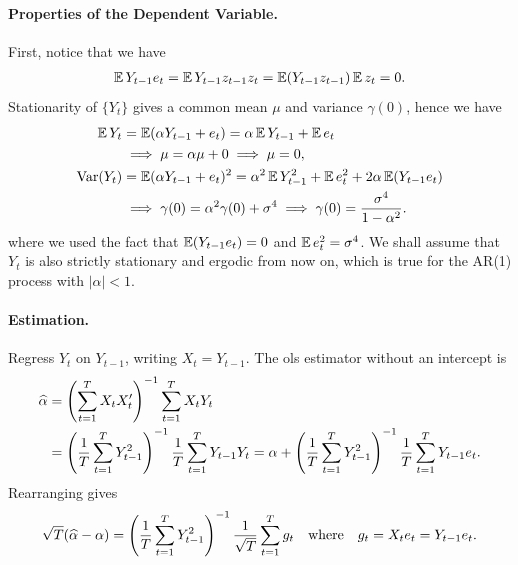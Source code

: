 \documentclass[a4paper,12pt]{article}
\begin{document}
\paragraph{Properties of the Dependent Variable.}
First, notice that we have
\begin{align}
	\operatorname{\mathbb{E}} Y_{t-1} e_t = \operatorname{\mathbb{E}} Y_{t-1} z_{t-1} z_t = \operatorname{\mathbb{E}} (Y_{t-1} z_{t-1}) \operatorname{\mathbb{E}} z_t = 0.
\end{align}
Stationarity of $\{Y_t\}$ gives a common mean $\mu$ and variance $\gamma(0)$, hence we have
\begin{align}
	\operatorname{\mathbb{E}} Y_t &= \operatorname{\mathbb{E}}(\alpha Y_{t-1} + e_t) = \alpha \operatorname{\mathbb{E}} Y_{t-1} + \operatorname{\mathbb{E}} e_t \nonumber\\
	&\implies
	\mu = \alpha \mu + 0 \implies \mu = 0,\\
	\operatorname{\text{\textrm{\upshape{Var}}}}(Y_t) &= \operatorname{\mathbb{E}}(\alpha Y_{t-1} + e_t)^2 = \alpha^2 \operatorname{\mathbb{E}} Y_{t-1}^2 + \operatorname{\mathbb{E}} e_t^2 + 2\alpha \operatorname{\mathbb{E}}(Y_{t-1} e_t) \nonumber\\
	&\implies \gamma(0) = \alpha^2 \gamma(0) + \sigma^4 \implies \gamma(0) = \frac{\sigma^4}{1 - \alpha^2}.
\end{align}
where we used the fact that $\operatorname{\mathbb{E}}(Y_{t-1} e_t) = 0$ and $\operatorname{\mathbb{E}} e_t^2 = \sigma^4$.
We shall assume that $Y_t$ is also strictly stationary and ergodic from now on,
which is true for the AR(1) process with $|\alpha|<1$.

\paragraph{Estimation.}
Regress $Y_t$ on $Y_{t-1}$, writing $X_t=Y_{t-1}$.
The \gls{ols} estimator without an intercept is
\begin{align}
	\widehat\alpha
	&= \left(\sum_{t=1}^{T} X_t X_t^{\prime}\right)^{-1} \sum_{t=1}^{T} X_t Y_t \\
	&= \left(\frac1T\sum_{t=1}^{T} Y_{t-1}^2\right)^{-1} \frac1T\sum_{t=1}^{T} Y_{t-1}Y_t
	= \alpha + \left(\frac1T\sum_{t=1}^{T} Y_{t-1}^2\right)^{-1} \frac1T\sum_{t=1}^{T} Y_{t-1}e_t.
\end{align}
Rearranging gives
\begin{align}
	\sqrt{T}(\widehat\alpha - \alpha)
	= \left(\frac1T\sum_{t=1}^{T} Y_{t-1}^2\right)^{-1} \frac1{\sqrt{T}}\sum_{t=1}^{T} g_t
	\quad\text{where}\quad
	g_t = X_t e_t = Y_{t-1} e_t.
\end{align}
\end{document}
